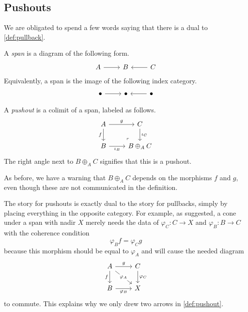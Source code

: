 \subsection{Pushouts}
We are obligated to spend a few words saying that there is a dual to \autoref{def:pullback}.
\begin{definition}[Span]
	A \textit{span} is a diagram of the following form.
	\[\begin{tikzcd}
		A & B & C
		\arrow[from=1-3, to=1-2]
		\arrow[from=1-1, to=1-2]
	\end{tikzcd}\]
	Equivalently, a span is the image of the following index category.
	\[\begin{tikzcd}
		\bullet & \bullet & \bullet
		\arrow[from=1-1, to=1-2]
		\arrow[from=1-3, to=1-2]
	\end{tikzcd}\]
\end{definition}
\begin{definition} \label{def:pushout}
	A \textit{pushout} is a colimit of a span, labeled as follows.
	\[\begin{tikzcd}
		A & C \\
		B & {B\oplus_AC}
		\arrow["f"', from=1-1, to=2-1]
		\arrow["g", from=1-1, to=1-2]
		\arrow["{\iota_C}", from=1-2, to=2-2]
		\arrow["{\iota_B}"', from=2-1, to=2-2]
		\arrow["\lrcorner"{anchor=center, pos=0.125, rotate=180}, draw=none, from=2-2, to=1-1]
	\end{tikzcd}\]
	The right angle next to $B\oplus_AC$ signifies that this is a pushout.
\end{definition}
As before, we have a warning that $B\oplus_AC$ depends on the morphisms $f$ and $g$, even though these are not communicated in the definition.

The story for pushouts is exactly dual to the story for pullbacks, simply by placing everything in the opposite category. For example, as suggested, a cone under a span with nadir $X$ merely needs the data of $\varphi_C:C\to X$ and $\varphi_B:B\to C$ with the coherence condition
\[\varphi_Bf=\varphi_Cg\]
because this morphism should be equal to $\varphi_A$ and will cause the needed diagram
\[\begin{tikzcd}
	A & C \\
	B & X
	\arrow["f"', from=1-1, to=2-1]
	\arrow["g", from=1-1, to=1-2]
	\arrow["{\varphi_C}", from=1-2, to=2-2]
	\arrow["{\varphi_B}"', from=2-1, to=2-2]
	\arrow["{\varphi_A}"{description}, from=1-1, to=2-2]
\end{tikzcd}\]
to commute. This explains why we only drew two arrows in \autoref{def:pushout}.

